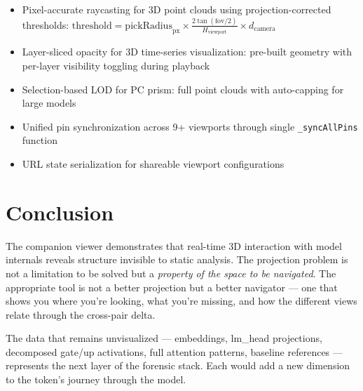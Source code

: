 \documentclass[11pt,a4paper]{article}
\begin{document}
\begin{itemize}
\item Pixel-accurate raycasting for 3D point clouds using projection-corrected thresholds: $\text{threshold} = \text{pickRadius}_\text{px} \times \frac{2 \tan(\text{fov}/2)}{H_\text{viewport}} \times d_\text{camera}$
\item Layer-sliced opacity for 3D time-series visualization: pre-built geometry with per-layer visibility toggling during playback
\item Selection-based LOD for PC prism: full point clouds with auto-capping for large models
\item Unified pin synchronization across 9+ viewports through single \texttt{\_syncAllPins} function
\item URL state serialization for shareable viewport configurations
\end{itemize}

\section{Conclusion}

The companion viewer demonstrates that real-time 3D interaction with model internals reveals structure invisible to static analysis. The projection problem is not a limitation to be solved but a \emph{property of the space to be navigated}. The appropriate tool is not a better projection but a better navigator — one that shows you where you're looking, what you're missing, and how the different views relate through the cross-pair delta.

The data that remains unvisualized — embeddings, lm\_head projections, decomposed gate/up activations, full attention patterns, baseline references — represents the next layer of the forensic stack. Each would add a new dimension to the token's journey through the model.
\end{document}
